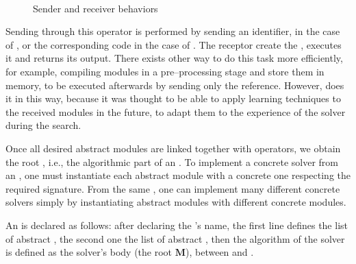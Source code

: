 
\begin{figure}[h]
\centering
{}\\
\caption[]{Sender and receiver behaviors}
\label{fig:send_recv}
\end{figure}

Sending \ms{} through this operator is performed by sending an identifier, in the case of \oms, or the corresponding \posl{} code in the case of \cms. The receptor \dopch{} create the \m, executes it and returns its output. There exists other way to do this task more efficiently, for example, compiling modules in a pre--processing stage and store them in memory, to be executed afterwards by sending only the reference. However, \posl{} does it in this way, because it was thought to be able to apply learning techniques to the received modules in the future, to adapt them to the experience of the solver during the search.

\separation

Once all desired abstract modules are linked together with operators, we obtain the root \cm{}, i.e., the algorithmic part of an \as. To implement a concrete solver from an \as, one must instantiate each abstract module with a concrete one respecting the required signature. From the same \as, one can implement many different concrete solvers simply by instantiating abstract modules with different concrete modules.

An \as{} is declared as follows: after declaring the \mbox{\tet{\bf \as}}'s name, the first line defines the list of abstract \oms, the second one the list of abstract \opchs, then the algorithm of the solver is defined as the solver's body (the root \cm{} $\mathbf{M}$), between \mbox{} and \mbox{}.

